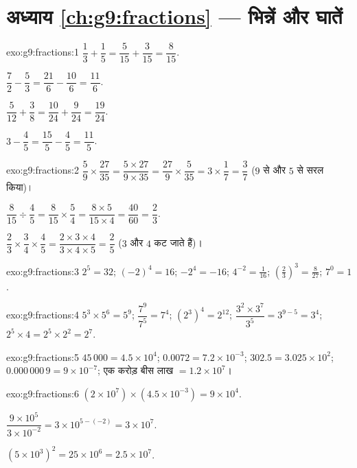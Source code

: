 \section*{अध्याय \ref{ch:g9:fractions} --- भिन्नें और घातें}

\begin{solution}{exo:g9:fractions:1}
$\dfrac13 + \dfrac15 = \dfrac{5}{15} + \dfrac{3}{15} = \dfrac{8}{15}$.

$\dfrac72 - \dfrac53 = \dfrac{21}{6} - \dfrac{10}{6} = \dfrac{11}{6}$.

$\dfrac{5}{12} + \dfrac38 = \dfrac{10}{24} + \dfrac{9}{24} =
\dfrac{19}{24}$.

$3 - \dfrac45 = \dfrac{15}{5} - \dfrac45 = \dfrac{11}{5}$.
\end{solution}

\begin{solution}{exo:g9:fractions:2}
$\dfrac59 \times \dfrac{27}{35} = \dfrac{5 \times 27}{9 \times 35}
= \dfrac{27}{9} \times \dfrac{5}{35} = 3 \times \dfrac17 = \dfrac37$
($9$ से और $5$ से सरल किया)।

$\dfrac{8}{15} \div \dfrac45 = \dfrac{8}{15} \times \dfrac54
= \dfrac{8 \times 5}{15 \times 4} = \dfrac{40}{60} = \dfrac23$.

$\dfrac23 \times \dfrac34 \times \dfrac45 = \dfrac{2 \times 3 \times 4}
{3 \times 4 \times 5} = \dfrac25$ ($3$ और $4$ कट जाते हैं)।
\end{solution}

\begin{solution}{exo:g9:fractions:3}
$2^5 = 32$; \quad $(-2)^4 = 16$; \quad $-2^4 = -16$; \quad
$4^{-2} = \frac{1}{16}$; \quad
$\left(\frac23\right)^3 = \frac{8}{27}$; \quad $7^0 = 1$.
\end{solution}

\begin{solution}{exo:g9:fractions:4}
$5^3 \times 5^6 = 5^9$; \quad $\dfrac{7^9}{7^5} = 7^4$; \quad
$\left(2^3\right)^4 = 2^{12}$; \quad
$\dfrac{3^2 \times 3^7}{3^5} = 3^{9-5} = 3^4$; \quad
$2^5 \times 4 = 2^5 \times 2^2 = 2^7$.
\end{solution}

\begin{solution}{exo:g9:fractions:5}
$45\,000 = 4.5 \times 10^4$; \quad
$0.0072 = 7.2 \times 10^{-3}$; \quad
$302.5 = 3.025 \times 10^2$; \quad
$0.000\,000\,9 = 9 \times 10^{-7}$; \quad
एक करोड़ बीस लाख $= 1.2 \times 10^7$।
\end{solution}

\begin{solution}{exo:g9:fractions:6}
$(2 \times 10^7) \times (4.5 \times 10^{-3}) = 9 \times 10^{4}$.

$\dfrac{9 \times 10^5}{3 \times 10^{-2}} = 3 \times 10^{5 - (-2)}
= 3 \times 10^7$.

$(5 \times 10^3)^2 = 25 \times 10^6 = 2.5 \times 10^7$.
\end{solution}

